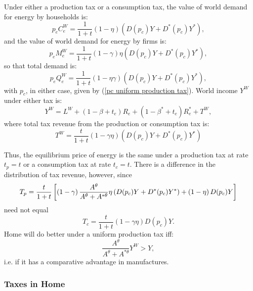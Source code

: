 \documentclass[notitlepage,12pt]{article}
\begin{document}
Under either a production tax or a consumption tax, the value of world
demand for energy by households is:%
\begin{equation*}
p_{e}C_{e}^{W}=\frac{1}{1+t}\left( 1-\eta \right) \left( D(p_{c})Y+D^{\ast
}(p_{c})Y^{\ast }\right) ,
\end{equation*}%
and the value of world demand for energy by firms is:%
\begin{equation*}
p_{e}M_{e}^{W}=\frac{1}{1+t}\left( 1-\gamma \right) \eta \left(
D(p_{c})Y+D^{\ast }(p_{c})Y^{\ast }\right) ,
\end{equation*}%
so that total demand is:%
\begin{equation*}
p_{e}Q_{e}^{W}=\frac{1}{1+t}\left( 1-\eta \gamma \right) \left(
D(p_{c})Y+D^{\ast }(p_{c})Y^{\ast }\right) ,
\end{equation*}%
with $p_{c}$, in either case, given by (\ref{pc uniform production tax}).
World income $Y^{W}$ under either tax is:%
\begin{equation*}
Y^{W}=L^{W}+\left( 1-\beta +t_{e}\right) R_{e}+\left( 1-\beta ^{\ast
}+t_{e}\right) R_{e}^{\ast }+T^{W},
\end{equation*}%
where total tax revenue from the production or consumption tax is:%
\begin{equation*}
T^{W}=\frac{t}{1+t}\left( 1-\gamma \eta \right) \left( D(p_{c})Y+D^{\ast
}(p_{c})Y^{\ast }\right)
\end{equation*}

Thus, the equilibrium price of energy is the same under a production tax at
rate $t_{p}=t$ or a consumption tax at rate $t_{c}=t$. There is a difference
in the distribution of tax revenue, however, since%
\begin{equation*}
T_{p}=\frac{t}{1+t}\left[ \left( 1-\gamma \right) \frac{A^{\theta }}{%
A^{\theta }+A^{\ast \theta }}\eta \left( D(p_{c})Y+D^{\ast }(p_{c})Y^{\ast
}\right) +\left( 1-\eta \right) D(p_{c})Y\right]
\end{equation*}%
need not equal%
\begin{equation*}
T_{c}=\frac{t}{1+t}\left( 1-\gamma \eta \right) D(p_{c})Y.
\end{equation*}%
Home will do better under a uniform production tax iff:%
\begin{equation*}
\frac{A^{\theta }}{A^{\theta }+A^{\ast \theta }}Y^{W}>Y,
\end{equation*}%
i.e. if it has a comparative advantage in manufactures.

\subsubsection{Taxes in Home}
\end{document}
